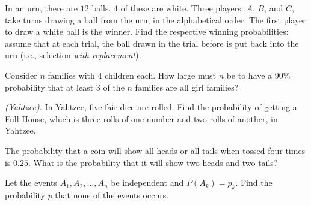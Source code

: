 \begin{problem}[Handout 5, \# 2]
  In an urn, there are \(12\) balls. \(4\) of these are white. Three
  players: \(A\), \(B\), and \(C\), take turns drawing a ball from the urn,
  in the alphabetical order. The first player to draw a white ball is the
  winner. Find the respective winning probabilities: assume that at each
  trial, the ball drawn in the trial before is put back into the urn (i.e.,
  selection \emph{with replacement}).
\end{problem}
\begin{solution}
\end{solution}
\newpage

\begin{problem}[Handout 5, \# 8]
  Consider \(n\) families with \(4\) children each. How large must \(n\) be
  to have a \(90\%\) probability that at least \(3\) of the \(n\) families
  are all girl families?
\end{problem}
\begin{solution}

\end{solution}
\newpage

\begin{problem}[Handout 5, \# 10]
  \emph{(Yahtzee).} In Yahtzee, five fair dice are rolled. Find the
  probability of getting a Full House, which is three rolls of one number
  and two rolls of another, in Yahtzee.
\end{problem}
\begin{solution}

\end{solution}
\newpage

\begin{problem}[Handout 5, \# 12]
  The probability that a coin will show all heads or all tails when tossed
  four times is \(0.25\). What is the probability that it will show two
  heads and two tails?
\end{problem}
\begin{solution}

\end{solution}
\newpage

\begin{problem}[Handout 5, \# 13]
  Let the events \(A_1, A_2,\dotsc,A_n\) be independent and
  \(P(A_k)=p_k\). Find the probability \(p\) that none of the events
  occurs.
\end{problem}
\begin{solution}
\end{solution}
\newpage

